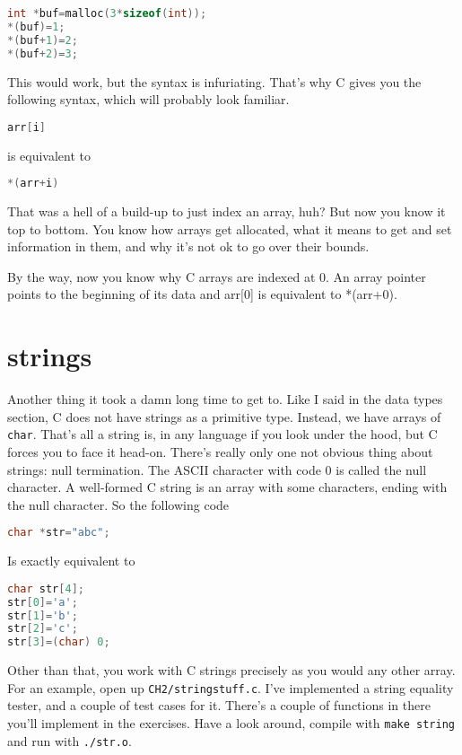 \documentclass[ebook,11pt,oneside,openany]{memoir}
\begin{document}
\begin{lstlisting}[language=C]
int *buf=malloc(3*sizeof(int));
*(buf)=1;
*(buf+1)=2;
*(buf+2)=3;
\end{lstlisting}

This would work, but the syntax is infuriating. That's why C gives you the following syntax, which will probably look familiar. 

\begin{lstlisting}[language=C]
arr[i]
\end{lstlisting}

is equivalent to

\begin{lstlisting}[language=C]
*(arr+i)
\end{lstlisting}

That was a hell of a build-up to just index an array, huh? But now you know it top to bottom. You know how arrays get allocated, what it means to get and set information in them, and why it's not ok to go over their bounds.

By the way, now you know why C arrays are indexed at 0. An array pointer points to the beginning of its data and arr[0] is equivalent to *(arr+0).

\section{strings}

Another thing it took a damn long time to get to. Like I said in the data types section, C does not have strings as a primitive type. Instead, we have arrays of \texttt{char}. That's all a string is, in any language if you look under the hood, but C forces you to face it head-on. There's really only one not obvious thing about strings: null termination. The ASCII character with code 0 is called the null character. A well-formed C string is an array with some characters, ending with the null character. So the following code

\begin{lstlisting}[language=C]
char *str="abc";
\end{lstlisting}

\noindent
Is exactly equivalent to 

\begin{lstlisting}[language=C]
char str[4];
str[0]='a';
str[1]='b';
str[2]='c';
str[3]=(char) 0;
\end{lstlisting}

Other than that, you work with C strings precisely as you would any other array. For an example, open up \texttt{CH2/stringstuff.c}. I've implemented a string equality tester, and a couple of test cases for it. There's a couple of functions in there you'll implement in the exercises. Have a look around, compile with \texttt{make string} and run with \texttt{./str.o}.
\end{document}
